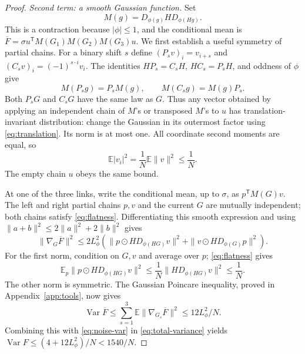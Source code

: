 \documentclass[11pt]{article}
\newcommand{\E}{\mathbb E}
\newcommand{\Var}{\operatorname{Var}}
\newcommand{\1}{\mathbf 1}
\begin{document}
\begin{proof}
\emph{Second term: a smooth Gaussian function.}
Set
\[
 M(g)=D_{\phi(g)}H D_{\phi(Hg)}.
\]
This is a contraction because $|\phi|\le1$, and the conditional mean is
$\overline F=\sigma u^{\mathsf T}M(G_1)M(G_2)M(G_3)u$.
We first establish a useful symmetry of partial chains.
For a binary shift $s$ define
$(P_sv)_i=v_{i+s}$ and $(C_sv)_i=(-1)^{s\cdot i}v_i$.
The identities $HP_s=C_sH$, $HC_s=P_sH$, and oddness of $\phi$ give
\begin{equation}\label{eq:translation}
                  M(P_sg)=P_sM(g),\qquad M(C_sg)=M(g)P_s.
\end{equation}
Both $P_sG$ and $C_sG$ have the same law as $G$.
Thus any vector obtained by applying an independent chain of $M$'s
or transposed $M$'s to $u$ has translation-invariant distribution:
change the Gaussian in its outermost factor using \eqref{eq:translation}.
Its norm is at most one. All coordinate second moments are equal, so
\begin{equation}\label{eq:flatness}
                    \E|v_i|^2=\frac1N\E\|v\|^2\le\frac1N.
\end{equation}
The empty chain $u$ obeys the same bound.

At one of the three links, write the conditional mean, up to $\sigma$,
as $p^{\mathsf T}M(G)v$. The left and right partial chains $p,v$ and
the current $G$ are mutually independent; both chains satisfy
\eqref{eq:flatness}. Differentiating this smooth expression and using
$\|a+b\|^2\le2\|a\|^2+2\|b\|^2$ gives
\[
 \|\nabla_G\overline F\|^2\le2L_\phi^2
 \left(\|p\odot HD_{\phi(HG)}v\|^2+
       \|v\odot HD_{\phi(G)}p\|^2\right).
\]
For the first norm, condition on $G,v$ and average over $p$;
\eqref{eq:flatness} gives
\[
 \E_p\|p\odot HD_{\phi(HG)}v\|^2
       \le\frac1N\|HD_{\phi(HG)}v\|^2\le\frac1N.
\]
The other norm is symmetric.
The Gaussian Poincare inequality, proved in Appendix~\ref{app:tools},
now gives
\[
 \Var\overline F\le\sum_{s=1}^3\E\|\nabla_{G_s}\overline F\|^2
                         \le12L_\phi^2/N.
\]
Combining this with \eqref{eq:noise-var} in \eqref{eq:total-variance}
yields $\Var F\le(4+12L_\phi^2)/N<1540/N$.
\end{proof}
\end{document}
